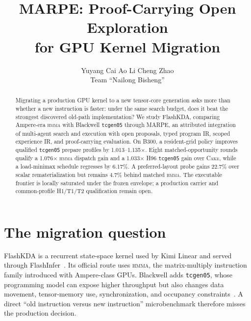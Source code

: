 \documentclass[11pt]{article}
\title{\textbf{MARPE}: Proof-Carrying Open Exploration\\
for GPU Kernel Migration}
\author{Yuyang Cai \quad Ao Li \quad Cheng Zhao\\[0.3em]
\small Team ``Nailong Bisheng''}
\date{}
\newcommand{\hmma}{\textsc{hmma}}
\newcommand{\tcgen}{\texttt{tcgen05}}
\newcommand{\cake}{\textsc{Cake}}
\begin{document}
\maketitle

\begin{abstract}
Migrating a production GPU kernel to a new tensor-core generation asks more than whether a new instruction is faster: under the same search budget, does it beat the strongest discovered old-path implementation? We study FlashKDA, comparing Ampere-era \hmma{} with Blackwell \tcgen{} through MARPE, an attributed integration of multi-agent search and execution with open proposals, typed program IR, scoped experience IR, and proof-carrying evaluation. On B300, a resident-grid policy improves qualified \tcgen{} prepare profiles by 1.013--1.135$\times$. Eight matched-opportunity rounds qualify a 1.076$\times$ \hmma{} dispatch gain and a 1.033$\times$ H96 \tcgen{} gain over \cake{}, while a load-minimax schedule regresses by 6.17\%. A preferred-layout probe gains 22.7\% over scalar rematerialization but remains 4.7\% behind matched \hmma{}. The executable frontier is locally saturated under the frozen envelope; a production carrier and common-profile H1/T1/T2 qualification remain open.
\end{abstract}

\section{The migration question}

FlashKDA is a recurrent state-space kernel used by Kimi Linear and served through FlashInfer~\citep{kimi_linear2025,flashkda2025,flashinfer2025}. Its official route uses \hmma{}, the matrix-multiply instruction family introduced with Ampere-class GPUs. Blackwell adds \tcgen{}, whose programming model can expose higher throughput but also changes data movement, tensor-memory use, synchronization, and occupancy constraints~\citep{cuda2026,blackwell2026}. A direct ``old instruction versus new instruction'' microbenchmark therefore misses the production decision.
\end{document}
